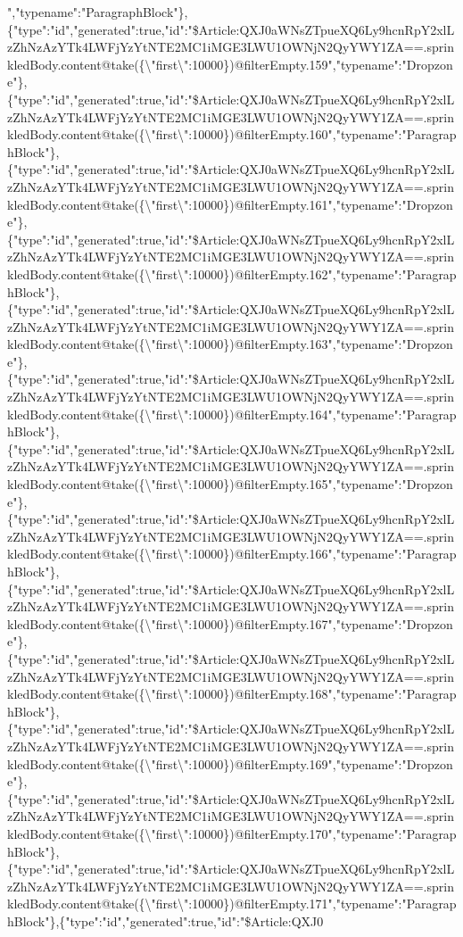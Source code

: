 ","typename":"ParagraphBlock"\},\{"type":"id","generated":true,"id":"\$Article:QXJ0aWNsZTpueXQ6Ly9hcnRpY2xlLzZhNzAzYTk4LWFjYzYtNTE2MC1iMGE3LWU1OWNjN2QyYWY1ZA==.sprinkledBody.content@take(\{\textbackslash{}"first\textbackslash{}":10000\})@filterEmpty.159","typename":"Dropzone"\},\{"type":"id","generated":true,"id":"\$Article:QXJ0aWNsZTpueXQ6Ly9hcnRpY2xlLzZhNzAzYTk4LWFjYzYtNTE2MC1iMGE3LWU1OWNjN2QyYWY1ZA==.sprinkledBody.content@take(\{\textbackslash{}"first\textbackslash{}":10000\})@filterEmpty.160","typename":"ParagraphBlock"\},\{"type":"id","generated":true,"id":"\$Article:QXJ0aWNsZTpueXQ6Ly9hcnRpY2xlLzZhNzAzYTk4LWFjYzYtNTE2MC1iMGE3LWU1OWNjN2QyYWY1ZA==.sprinkledBody.content@take(\{\textbackslash{}"first\textbackslash{}":10000\})@filterEmpty.161","typename":"Dropzone"\},\{"type":"id","generated":true,"id":"\$Article:QXJ0aWNsZTpueXQ6Ly9hcnRpY2xlLzZhNzAzYTk4LWFjYzYtNTE2MC1iMGE3LWU1OWNjN2QyYWY1ZA==.sprinkledBody.content@take(\{\textbackslash{}"first\textbackslash{}":10000\})@filterEmpty.162","typename":"ParagraphBlock"\},\{"type":"id","generated":true,"id":"\$Article:QXJ0aWNsZTpueXQ6Ly9hcnRpY2xlLzZhNzAzYTk4LWFjYzYtNTE2MC1iMGE3LWU1OWNjN2QyYWY1ZA==.sprinkledBody.content@take(\{\textbackslash{}"first\textbackslash{}":10000\})@filterEmpty.163","typename":"Dropzone"\},\{"type":"id","generated":true,"id":"\$Article:QXJ0aWNsZTpueXQ6Ly9hcnRpY2xlLzZhNzAzYTk4LWFjYzYtNTE2MC1iMGE3LWU1OWNjN2QyYWY1ZA==.sprinkledBody.content@take(\{\textbackslash{}"first\textbackslash{}":10000\})@filterEmpty.164","typename":"ParagraphBlock"\},\{"type":"id","generated":true,"id":"\$Article:QXJ0aWNsZTpueXQ6Ly9hcnRpY2xlLzZhNzAzYTk4LWFjYzYtNTE2MC1iMGE3LWU1OWNjN2QyYWY1ZA==.sprinkledBody.content@take(\{\textbackslash{}"first\textbackslash{}":10000\})@filterEmpty.165","typename":"Dropzone"\},\{"type":"id","generated":true,"id":"\$Article:QXJ0aWNsZTpueXQ6Ly9hcnRpY2xlLzZhNzAzYTk4LWFjYzYtNTE2MC1iMGE3LWU1OWNjN2QyYWY1ZA==.sprinkledBody.content@take(\{\textbackslash{}"first\textbackslash{}":10000\})@filterEmpty.166","typename":"ParagraphBlock"\},\{"type":"id","generated":true,"id":"\$Article:QXJ0aWNsZTpueXQ6Ly9hcnRpY2xlLzZhNzAzYTk4LWFjYzYtNTE2MC1iMGE3LWU1OWNjN2QyYWY1ZA==.sprinkledBody.content@take(\{\textbackslash{}"first\textbackslash{}":10000\})@filterEmpty.167","typename":"Dropzone"\},\{"type":"id","generated":true,"id":"\$Article:QXJ0aWNsZTpueXQ6Ly9hcnRpY2xlLzZhNzAzYTk4LWFjYzYtNTE2MC1iMGE3LWU1OWNjN2QyYWY1ZA==.sprinkledBody.content@take(\{\textbackslash{}"first\textbackslash{}":10000\})@filterEmpty.168","typename":"ParagraphBlock"\},\{"type":"id","generated":true,"id":"\$Article:QXJ0aWNsZTpueXQ6Ly9hcnRpY2xlLzZhNzAzYTk4LWFjYzYtNTE2MC1iMGE3LWU1OWNjN2QyYWY1ZA==.sprinkledBody.content@take(\{\textbackslash{}"first\textbackslash{}":10000\})@filterEmpty.169","typename":"Dropzone"\},\{"type":"id","generated":true,"id":"\$Article:QXJ0aWNsZTpueXQ6Ly9hcnRpY2xlLzZhNzAzYTk4LWFjYzYtNTE2MC1iMGE3LWU1OWNjN2QyYWY1ZA==.sprinkledBody.content@take(\{\textbackslash{}"first\textbackslash{}":10000\})@filterEmpty.170","typename":"ParagraphBlock"\},\{"type":"id","generated":true,"id":"\$Article:QXJ0aWNsZTpueXQ6Ly9hcnRpY2xlLzZhNzAzYTk4LWFjYzYtNTE2MC1iMGE3LWU1OWNjN2QyYWY1ZA==.sprinkledBody.content@take(\{\textbackslash{}"first\textbackslash{}":10000\})@filterEmpty.171","typename":"ParagraphBlock"\},\{"type":"id","generated":true,"id":"\$Article:QXJ0